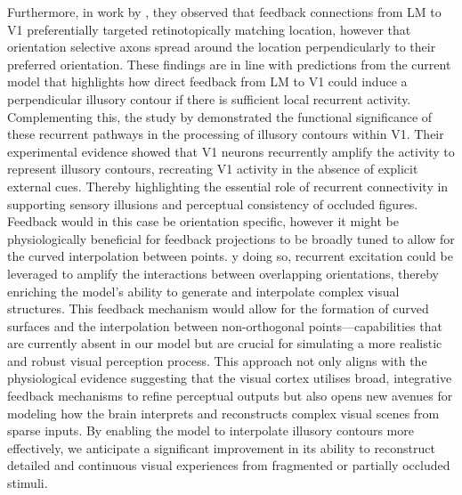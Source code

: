 \documentclass[12pt]{article}
\begin{document}
Furthermore, in work by \textcite{marquesFunctionalOrganizationCortical2018}, they observed that feedback connections from LM to V1 preferentially targeted retinotopically matching location, however that orientation selective axons spread around the location perpendicularly to their preferred orientation. These findings are in line with predictions from the current model that highlights how direct feedback from LM to V1 could induce a perpendicular illusory contour if there is sufficient local recurrent activity. Complementing this, the study by \textcite{shinRecurrentPatternCompletion2023} demonstrated the functional significance of these recurrent pathways in the processing of illusory contours within V1. Their experimental evidence showed that V1 neurons recurrently amplify the activity to represent illusory contours, recreating V1 activity in the absence of explicit external cues. Thereby highlighting the essential role of recurrent connectivity in supporting sensory illusions and perceptual consistency of occluded figures. Feedback would in this case be orientation specific, however it might be physiologically beneficial for feedback projections to be broadly tuned to allow for the curved interpolation between points. y doing so, recurrent excitation could be leveraged to amplify the interactions between overlapping orientations, thereby enriching the model's ability to generate and interpolate complex visual structures. This feedback mechanism would allow for the formation of curved surfaces and the interpolation between non-orthogonal points—capabilities that are currently absent in our model but are crucial for simulating a more realistic and robust visual perception process. This approach not only aligns with the physiological evidence suggesting that the visual cortex utilises broad, integrative feedback mechanisms to refine perceptual outputs but also opens new avenues for modeling how the brain interprets and reconstructs complex visual scenes from sparse inputs. By enabling the model to interpolate illusory contours more effectively, we anticipate a significant improvement in its ability to reconstruct detailed and continuous visual experiences from fragmented or partially occluded stimuli. 
\end{document}
